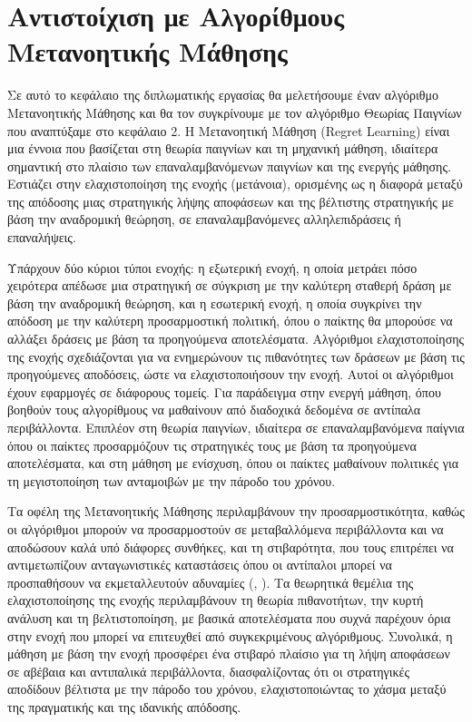 \chapter{Αντιστοίχιση με Αλγορίθμους Μετανοητικής Μάθησης}

Σε αυτό το κεφάλαιο της διπλωματικής εργασίας θα μελετήσουμε έναν αλγόριθμο Μετανοητικής Μάθησης και θα τον συγκρίνουμε με τον αλγόριθμο Θεωρίας Παιγνίων που αναπτύξαμε στο κεφάλαιο 2. Η Μετανοητική Μάθηση (Regret Learning) είναι μια έννοια που βασίζεται στη θεωρία παιγνίων και τη μηχανική μάθηση, ιδιαίτερα σημαντική στο πλαίσιο των επαναλαμβανόμενων παιγνίων και της ενεργής μάθησης. Εστιάζει στην ελαχιστοποίηση της ενοχής (μετάνοια), ορισμένης ως η διαφορά μεταξύ της απόδοσης μιας στρατηγικής λήψης αποφάσεων και της βέλτιστης στρατηγικής με βάση την αναδρομική θεώρηση, σε επαναλαμβανόμενες αλληλεπιδράσεις ή επαναλήψεις. 

Υπάρχουν δύο κύριοι τύποι ενοχής: η εξωτερική ενοχή, η οποία μετράει πόσο χειρότερα απέδωσε μια στρατηγική σε σύγκριση με την καλύτερη σταθερή δράση με βάση την αναδρομική θεώρηση, και η εσωτερική ενοχή, η οποία συγκρίνει την απόδοση με την καλύτερη προσαρμοστική πολιτική, όπου ο παίκτης θα μπορούσε να αλλάξει δράσεις με βάση τα προηγούμενα αποτελέσματα. Αλγόριθμοι ελαχιστοποίησης της ενοχής σχεδιάζονται για να ενημερώνουν τις πιθανότητες των δράσεων με βάση τις προηγούμενες αποδόσεις, ώστε να ελαχιστοποιήσουν την ενοχή. Αυτοί οι αλγόριθμοι έχουν εφαρμογές σε διάφορους τομείς. Για παράδειγμα στην ενεργή μάθηση, όπου βοηθούν τους αλγορίθμους να μαθαίνουν από διαδοχικά δεδομένα σε αντίπαλα περιβάλλοντα. Επιπλέον στη θεωρία παιγνίων, ιδιαίτερα σε επαναλαμβανόμενα παίγνια όπου οι παίκτες προσαρμόζουν τις στρατηγικές τους με βάση τα προηγούμενα αποτελέσματα, και στη μάθηση με ενίσχυση, όπου οι παίκτες μαθαίνουν πολιτικές για τη μεγιστοποίηση των ανταμοιβών με την πάροδο του χρόνου. 

Τα οφέλη της Μετανοητικής Μάθησης περιλαμβάνουν την προσαρμοστικότητα, καθώς οι αλγόριθμοι μπορούν να προσαρμοστούν σε μεταβαλλόμενα περιβάλλοντα και να αποδώσουν καλά υπό διάφορες συνθήκες, και τη στιβαρότητα, που τους επιτρέπει να αντιμετωπίζουν ανταγωνιστικές καταστάσεις όπου οι αντίπαλοι μπορεί να προσπαθήσουν να εκμεταλλευτούν αδυναμίες (, ). Τα θεωρητικά θεμέλια της ελαχιστοποίησης της ενοχής περιλαμβάνουν τη θεωρία πιθανοτήτων, την κυρτή ανάλυση και τη βελτιστοποίηση, με βασικά αποτελέσματα που συχνά παρέχουν όρια στην ενοχή που μπορεί να επιτευχθεί από συγκεκριμένους αλγόριθμους. Συνολικά, η μάθηση με βάση την ενοχή προσφέρει ένα στιβαρό πλαίσιο για τη λήψη αποφάσεων σε αβέβαια και αντιπαλικά περιβάλλοντα, διασφαλίζοντας ότι οι στρατηγικές αποδίδουν βέλτιστα με την πάροδο του χρόνου, ελαχιστοποιώντας το χάσμα μεταξύ της πραγματικής και της ιδανικής απόδοσης.

